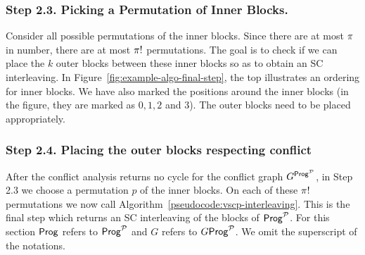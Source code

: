 \subsubsection*{Step 2.3. Picking a Permutation of Inner Blocks.}

Consider all possible permutations of the inner blocks. Since there are at most $\pi$ in number, there are at most $\pi!$ permutations. The goal is to check if we can place the $k$ outer blocks between these inner blocks so as to obtain an SC interleaving. In Figure~\ref{fig:example-algo-final-step}, the top illustrates an ordering for inner blocks.  We have also marked the positions around the inner blocks (in the figure, they are marked as $0, 1, 2$ and $3$). The outer blocks need to be placed appropriately.

\subsubsection*{Step 2.4. Placing the outer blocks respecting conflict}

After the conflict analysis returns no cycle for the conflict graph $G^{\mathsf{Prog}
^{\mathcal{P}}}$, in Step 2.3 we choose a permutation $p$ of the inner blocks. On each of these $\pi!$ permutations we now call Algorithm~\ref{pseudocode:vscp-interleaving}. This is the final step which returns an SC interleaving of the blocks of $\mathsf{Prog}^{\mathcal{P}}$. For this section $\mathsf{Prog}$ refers to $\mathsf{Prog}^{\mathcal{P}}$ and $G$ refers to $G{\mathsf{Prog}
^{\mathcal{P}}}$. We omit the superscript of the notations.



